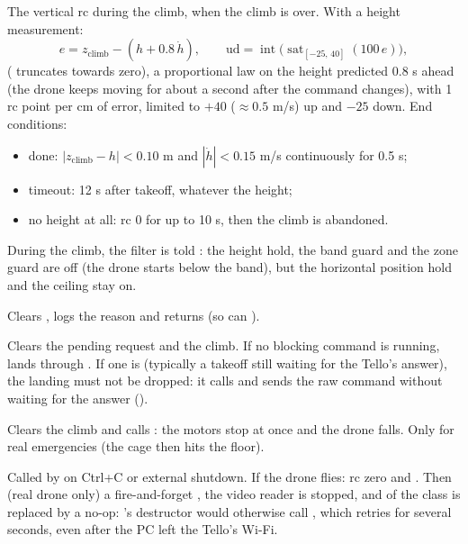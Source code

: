 The vertical rc during the climb,  when the climb is over. With a height measurement:
$$
e = z_{\text{climb}} - (h + 0.8\,\dot h), \qquad \text{ud} = \operatorname{int}\big(\operatorname{sat}_{[-25,\,40]}(100\,e)\big),
$$
( truncates towards zero),
a proportional law on the height predicted 0.8 s ahead (the drone keeps moving for about a second after the
command changes), with 1 rc point per cm of error, limited to $+40$ ($\approx0.5$ m/s) up and $-25$ down.
End conditions:
\begin{itemize}[itemsep=1pt]
\item done: $|z_{\text{climb}}-h|<0.10$ m and $|\dot h|<0.15$ m/s continuously for 0.5 s;
\item timeout: 12 s after takeoff, whatever the height;
\item no height at all: rc 0 for up to 10 s, then the climb is abandoned.
\end{itemize}
During the climb, the filter is told : the height hold, the band guard and the zone guard are
off (the drone starts below the band), but the horizontal position hold and the ceiling stay on.

Clears , logs the reason and returns  (so  can ).

Clears the pending request and the climb. If no blocking command is running, lands through .
If one is (typically a takeoff still waiting for the Tello's answer), the landing must not be dropped: it calls
 and sends the raw  command without waiting for the answer
().

Clears the climb and calls : the motors stop at once and the drone falls. Only for real
emergencies (the cage then hits the floor).

Called by  on Ctrl+C or external shutdown. If the drone flies: rc zero and . Then (real
drone only) a fire-and-forget , the video reader is stopped, and  of the
 class is replaced by a no-op: 's destructor would otherwise call , which
retries  for several seconds, even after the PC left the Tello's Wi-Fi.

